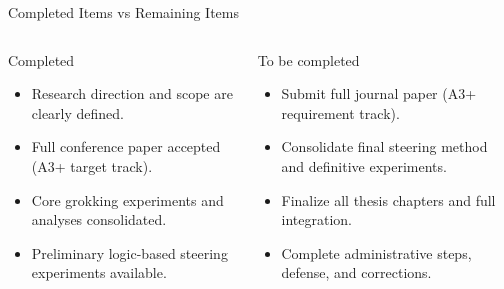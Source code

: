 \begin{frame}{Completed Items vs Remaining Items}
    \small
    \begin{columns}[T,onlytextwidth]
        \begin{block}{Completed}
            \begin{itemize}
                \item Research direction and scope are clearly defined.
                \item Full conference paper accepted (A3+ target track).
                \item Core grokking experiments and analyses consolidated.
                \item Preliminary logic-based steering experiments available.
            \end{itemize}
        \end{block}
        \begin{block}{To be completed}
            \begin{itemize}
                \item Submit full journal paper (A3+ requirement track).
                \item Consolidate final steering method and definitive experiments.
                \item Finalize all thesis chapters and full integration.
                \item Complete administrative steps, defense, and corrections.
            \end{itemize}
        \end{block}
    \end{columns}
\end{frame}

